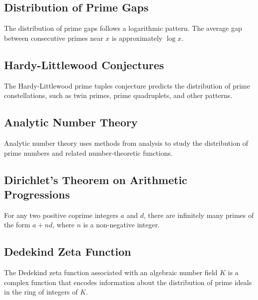 \documentclass{article}
\begin{document}
\subsection{Distribution of Prime Gaps}

\begin{theorem}
The distribution of prime gaps follows a logarithmic pattern. The average gap between consecutive primes near $x$ is approximately $\log x$.
\end{theorem}

\subsection{Hardy-Littlewood Conjectures}

\begin{theorem}
The Hardy-Littlewood prime tuples conjecture predicts the distribution of prime constellations, such as twin primes, prime quadruplets, and other patterns.
\end{theorem}

\subsection{Analytic Number Theory}

\begin{definition}
Analytic number theory uses methods from analysis to study the distribution of prime numbers and related number-theoretic functions.
\end{definition}

\subsection{Dirichlet's Theorem on Arithmetic Progressions}

\begin{theorem}
For any two positive coprime integers $a$ and $d$, there are infinitely many primes of the form $a + nd$, where $n$ is a non-negative integer.
\end{theorem}

\subsection{Dedekind Zeta Function}
\begin{definition}
The Dedekind zeta function associated with an algebraic number field $K$ is a complex function that encodes information about the distribution of prime ideals in the ring of integers of $K$.
\end{definition}
\end{document}

